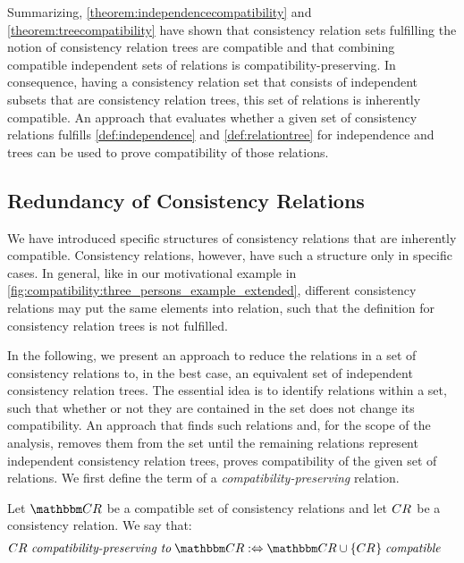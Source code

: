 Summarizing, \autoref{theorem:independencecompatibility} and \autoref{theorem:treecompatibility} have shown that consistency relation sets fulfilling the notion of consistency relation trees are compatible and that combining compatible independent sets of relations is compatibility-preserving.
In consequence, having a consistency relation set that consists of independent subsets that are consistency relation trees, this set of relations is inherently compatible.
An approach that evaluates whether a given set of consistency relations fulfills \autoref{def:independence} and \autoref{def:relationtree} for independence and trees can be used to prove compatibility of those relations.


\subsection{Redundancy of Consistency Relations}
\label{chap:compatibility:formal_approach:redundancy}

We have introduced specific structures of consistency relations that are inherently compatible.
Consistency relations, however, have such a structure only in specific cases.
In general, like in our motivational example in \autoref{fig:compatibility:three_persons_example_extended}, different consistency relations may put the same elements into relation, such that the definition for consistency relation trees is not fulfilled.

In the following, we present an approach to reduce the relations in a set of consistency relations to, in the best case, an equivalent set of independent consistency relation trees.
The essential idea is to identify relations within a set, such that whether or not they are contained in the set does not change its compatibility.
An approach that finds such relations and, for the scope of the analysis, removes them from the set until the remaining relations represent independent consistency relation trees, proves compatibility of the given set of relations.
We first define the term of a \emph{compatibility-preserving} relation.

\begin{definition}
    \label{def:compatibilitypreserving}
    Let $\consistencyrelationset{CR}$ be a compatible set of consistency relations and let $\consistencyrelation{CR}{}$ be a consistency relation. We say that:
    \begin{align*}
        &
        \consistencyrelation{CR}{} \compatibilitypreservingtomath \consistencyrelationset{CR} \equivalentperdefinition
        \consistencyrelationset{CR} \cup \setted{\consistencyrelation{CR}{}} \compatiblemath
    \end{align*}
\end{definition}

